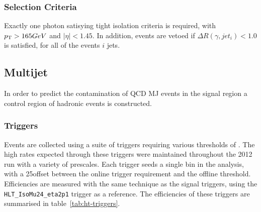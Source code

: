 \subsubsection{Selection Criteria}
Exactly one photon satisying tight isolation criteria is required, with 
${p_{\text T}} > 165GeV$ and $|\eta|<1.45$. In addition, events are vetoed if
$\Delta R(\gamma, jet_i)<1.0$ is satisfied, for all of the events $i$ jets.


\subsection{Multijet}
In order to predict the contamination of QCD MJ events in the signal region a 
control region of hadronic events is constructed.

\subsubsection{Triggers}
Events are collected using a suite of triggers requiring various thresholds of 
\HT. The high rates expected through these triggers were maintained throughout 
the 2012 run with a variety of prescales. Each trigger seeds a single \HT bin in
the analysis, with a 25\gev offset between the online trigger requirement and 
the offline threshold. Efficiencies are measured with the same technique as the
signal triggers, using the \verb!HLT_IsoMu24_eta2p1! trigger as a reference. 
The efficiencies of these triggers are summarised in table~\ref{tab:ht-triggers}.

